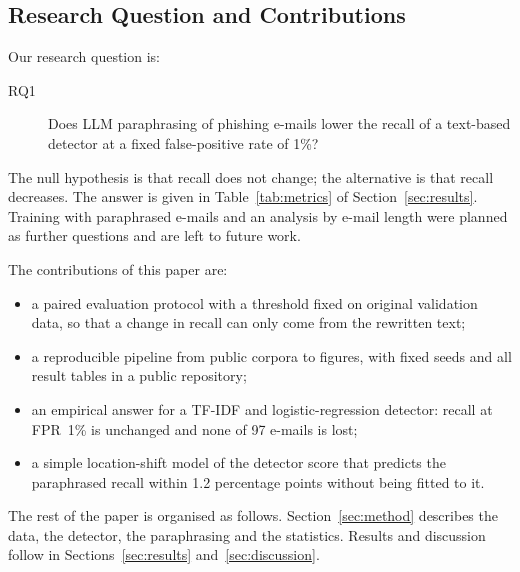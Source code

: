 \subsection{Research Question and Contributions}
\label{sec:intro:rq}

Our research question is:
\begin{description}
  \item[RQ1] Does LLM paraphrasing of phishing e-mails lower the recall of a text-based detector at a fixed false-positive rate of 1\%?
\end{description}
The null hypothesis is that recall does not change; the alternative is that recall decreases. The answer is given in Table~\ref{tab:metrics} of Section~\ref{sec:results}. Training with paraphrased e-mails and an analysis by e-mail length were planned as further questions and are left to future work.

The contributions of this paper are:
\begin{itemize}
  \item a paired evaluation protocol with a threshold fixed on original validation data, so that a change in recall can only come from the rewritten text;
  \item a reproducible pipeline from public corpora to figures, with fixed seeds and all result tables in a public repository;
  \item an empirical answer for a TF-IDF and logistic-regression detector: recall at FPR~1\% is unchanged and none of 97 e-mails is lost;
  \item a simple location-shift model of the detector score that predicts the paraphrased recall within 1.2 percentage points without being fitted to it.
\end{itemize}

The rest of the paper is organised as follows. Section~\ref{sec:method} describes the data, the detector, the paraphrasing and the statistics. Results and discussion follow in Sections~\ref{sec:results} and~\ref{sec:discussion}.
